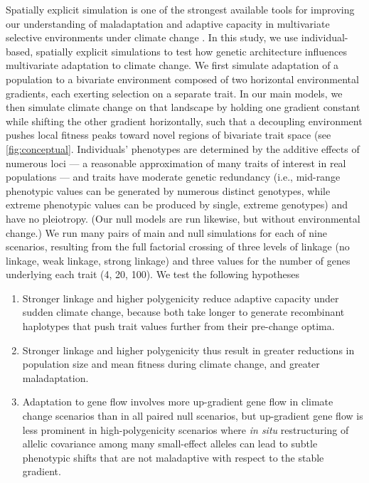 \documentclass[9pt,twocolumn,twoside,lineno]{pnas-new}
\begin{document}
Spatially explicit simulation is one of the strongest available tools
for improving our understanding of maladaptation and adaptive capacity
in multivariate selective environments
under climate change \cite{capblancq_review}.
In this study, we use individual-based, spatially explicit simulations to test how genetic architecture influences multivariate adaptation to climate change.
We first simulate 
adaptation of a population to a bivariate environment composed of two horizontal 
environmental gradients, each exerting selection on a separate trait.
In our main models, we then simulate climate change on that landscape by holding one gradient 
constant while shifting the other gradient horizontally, such that
a decoupling environment pushes local fitness peaks toward novel regions 
of bivariate trait space (see \ref{fig:conceptual}.
Individuals' phenotypes are determined by the additive effects of numerous loci ---
a reasonable approximation of many traits of interest in real populations \cite{sella} ---
and traits have moderate genetic redundancy 
(i.e., mid-range phenotypic values
can be generated by numerous distinct genotypes, while extreme phenotypic
values can be produced by single, extreme genotypes) and have no pleiotropy.
 (Our null models are run likewise, but without environmental 
change.) We run many pairs of main and null simulations for each of nine scenarios, 
resulting from the full factorial crossing of three levels of linkage (no linkage, weak 
linkage, strong linkage) and three values for the number of genes underlying each 
trait (4, 20, 100). We test the following hypotheses
\begin{enumerate}
    \item Stronger linkage and higher polygenicity reduce adaptive capacity under sudden climate change, because both take longer to generate recombinant haplotypes that push trait values further from their pre-change optima.
    \item Stronger linkage and higher polygenicity thus result in greater reductions in population size and mean fitness during climate change, and greater maladaptation.
    \item Adaptation to gene flow involves more up-gradient gene flow in climate change scenarios than in all paired null scenarios, but up-gradient gene flow is less prominent in high-polygenicity scenarios where \textit{in situ} restructuring of allelic covariance among many small-effect alleles can lead to subtle phenotypic shifts that are not maladaptive with respect to the stable gradient.
\end{enumerate}
\end{document}
